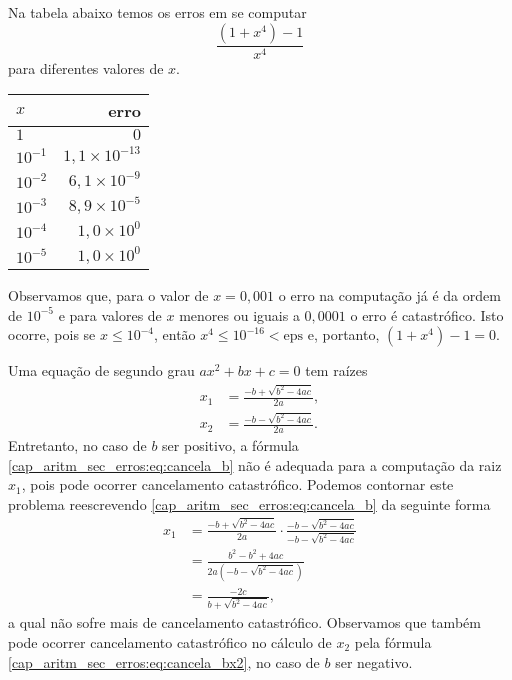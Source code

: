 \begin{ex}\label{ex:cancela_1}
  Na tabela abaixo temos os erros em se computar
  \begin{equation}
    \frac{(1+x^4)-1}{x^4}
  \end{equation}
  para diferentes valores de $x$.
  
  \begin{center}
    \begin{tabular}{l|r}
      $x$     & erro \\\hline
      $1$      & $0$ \\
      $10^{-1}$ & $1,1\times 10^{-13}$\\
      $10^{-2}$ & $6,1\times 10^{-9}$\\
      $10^{-3}$ & $8,9\times 10^{-5}$\\
      $10^{-4}$ & $1,0\times 10^{0}$\\
      $10^{-5}$ & $1,0\times 10^{0}$\\\hline
    \end{tabular}
  \end{center}
  Observamos que, para o valor de $x=0,001$ o erro na computação já é da ordem de $10^{-5}$ e para valores de $x$ menores ou iguais a $0,0001$ o erro é catastrófico. Isto ocorre, pois se $x\leq 10^{-4}$, então $x^4 \leq 10^{-16} < \mathrm{eps}$ e, portanto, $(1+x^4)-1=0$.
\end{ex}

\begin{ex}\label{ex:solpq}
  Uma equação de segundo grau $ax^2 + bx + c = 0$ tem raízes
  \begin{align}
    x_1 &= \frac{-b + \sqrt{b^2 - 4ac}}{2a},\label{cap_aritm_sec_erros:eq:cancela_b}\\
    x_2 &= \frac{-b - \sqrt{b^2 - 4ac}}{2a}.\label{cap_aritm_sec_erros:eq:cancela_bx2}
  \end{align}
Entretanto, no caso de $b$ ser positivo, a fórmula \eqref{cap_aritm_sec_erros:eq:cancela_b} não é adequada para a computação da raiz $x_1$, pois pode ocorrer cancelamento catastrófico. Podemos contornar este problema reescrevendo \eqref{cap_aritm_sec_erros:eq:cancela_b} da seguinte forma
\begin{align}
  x_1 &= \frac{-b + \sqrt{b^2 - 4ac}}{2a}\cdot \frac{-b - \sqrt{b^2 - 4ac}}{-b - \sqrt{b^2 - 4ac}}\\
  &= \frac{b^2 - b^2 + 4ac}{2a(-b-\sqrt{b^2-4ac})}\\
  &= \frac{-2c}{b+\sqrt{b^2-4ac}}\label{cap_aritm_sec_erros:eq:bx1m},
\end{align}
a qual não sofre mais de cancelamento catastrófico. Observamos que também pode ocorrer cancelamento catastrófico no cálculo de $x_2$ pela fórmula \eqref{cap_aritm_sec_erros:eq:cancela_bx2}, no caso de $b$ ser negativo.
\end{ex}

